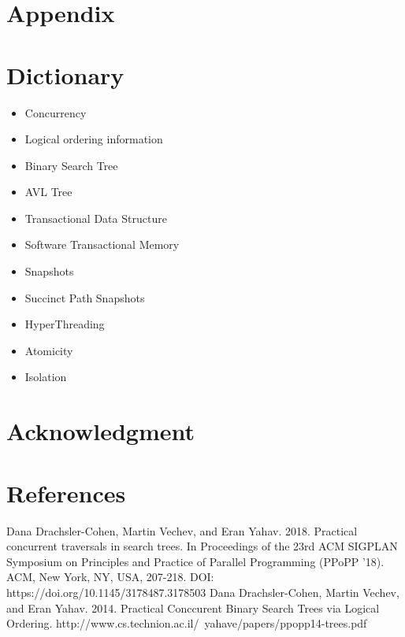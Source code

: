 \documentclass[conference]{IEEEtran}
\begin{document}

\section{Appendix}

\section{Dictionary}
\begin{itemize}[label=$\ast$]
	\item Concurrency
	\item Logical ordering information
	\item Binary Search Tree
	\item AVL Tree
	\item Transactional Data Structure
	\item Software Transactional Memory
	\item Snapshots
	\item Succinct Path Snapshots
	\item HyperThreading
	\item Atomicity 
	\item Isolation
\end{itemize}

\section*{Acknowledgment}

\section*{References}




\begin{thebibliography}{00}
 Dana Drachsler-Cohen, Martin Vechev, and Eran Yahav. 2018. Practical concurrent traversals in search trees. In Proceedings of the 23rd ACM SIGPLAN Symposium on Principles and Practice of Parallel Programming (PPoPP '18). ACM, New York, NY, USA, 207-218. DOI: https://doi.org/10.1145/3178487.3178503
 Dana Drachsler-Cohen, Martin Vechev, and Eran Yahav. 2014. Practical Conccurent Binary Search Trees via Logical Ordering. http://www.cs.technion.ac.il/~yahave/papers/ppopp14-trees.pdf

\end{thebibliography}
\end{document}
